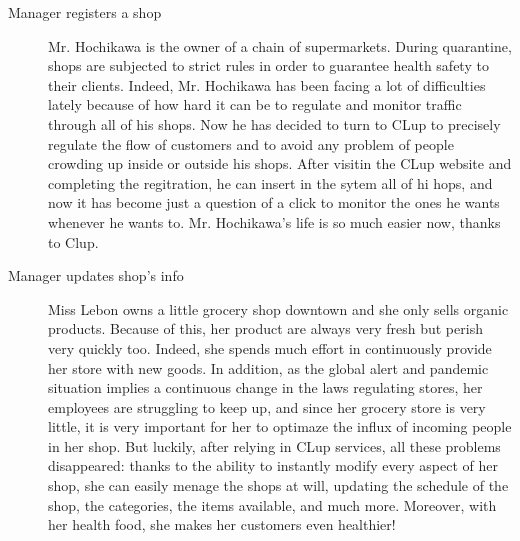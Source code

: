 \begin{description}
    \item[Manager registers a shop]
    Mr. Hochikawa is the owner of a chain of supermarkets.
    During quarantine, shops are subjected to strict rules in order to guarantee health safety to their clients. Indeed, Mr. Hochikawa has been facing a lot of difficulties lately because of how hard it can be to regulate and monitor traffic through all of his shops. Now he has decided to turn to CLup to precisely regulate the flow of customers and to avoid any problem of people crowding up inside or outside his shops. After visitin the CLup website and completing the regitration, he can insert in the sytem all of hi hops, and now it has become just a question of a click to monitor the ones he wants whenever he wants to. Mr. Hochikawa’s life is so much easier now, thanks to Clup.

    \item[Manager updates shop's info]
    Miss Lebon owns a little grocery shop downtown and she only sells organic products. Because of this, her product are always very fresh but perish very quickly too. Indeed, she spends much effort in continuously provide her store with new goods. In addition, as the global alert and pandemic situation implies a continuous change in the laws regulating stores, her employees are struggling to keep up, and since her grocery store is very little, it is very important for her to optimaze the influx of incoming people in her shop. But luckily, after relying in CLup services, all these problems disappeared: thanks to the ability to instantly modify every aspect of her shop, she can easily menage the shops at will, updating the schedule of the shop, the categories, the items available, and much more. Moreover, with her health food, she makes her customers even healthier!
\end{description}

